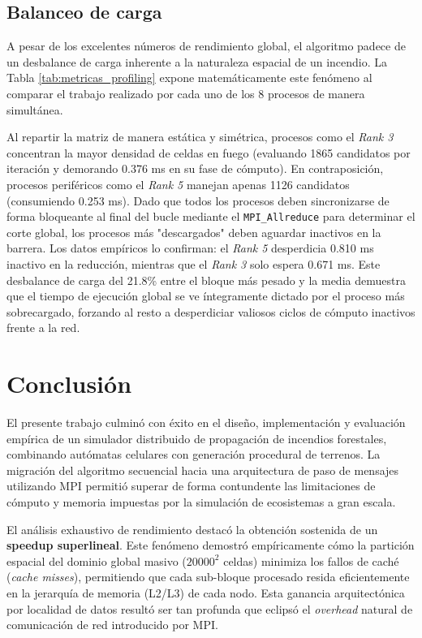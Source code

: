 \documentclass[10pt,a4paper]{article}
\begin{document}
\subsection{Balanceo de carga}
A pesar de los excelentes números de rendimiento global, el algoritmo padece de un desbalance de carga inherente a la naturaleza espacial de un incendio. La Tabla \ref{tab:metricas_profiling} expone matemáticamente este fenómeno al comparar el trabajo realizado por cada uno de los 8 procesos de manera simultánea.

Al repartir la matriz de manera estática y simétrica, procesos como el \textit{Rank 3} concentran la mayor densidad de celdas en fuego (evaluando 1865 candidatos por iteración y demorando 0.376 ms en su fase de cómputo). En contraposición, procesos periféricos como el \textit{Rank 5} manejan apenas 1126 candidatos (consumiendo 0.253 ms). Dado que todos los procesos deben sincronizarse de forma bloqueante al final del bucle mediante el \texttt{MPI\_Allreduce} para determinar el corte global, los procesos más "descargados" deben aguardar inactivos en la barrera. Los datos empíricos lo confirman: el \textit{Rank 5} desperdicia 0.810 ms inactivo en la reducción, mientras que el \textit{Rank 3} solo espera 0.671 ms. Este desbalance de carga del 21.8\% entre el bloque más pesado y la media demuestra que el tiempo de ejecución global se ve íntegramente dictado por el proceso más sobrecargado, forzando al resto a desperdiciar valiosos ciclos de cómputo inactivos frente a la red.

\section{Conclusión}
El presente trabajo culminó con éxito en el diseño, implementación y evaluación empírica de un simulador distribuido de propagación de incendios forestales, combinando autómatas celulares con generación procedural de terrenos. La migración del algoritmo secuencial hacia una arquitectura de paso de mensajes utilizando MPI permitió superar de forma contundente las limitaciones de cómputo y memoria impuestas por la simulación de ecosistemas a gran escala.

El análisis exhaustivo de rendimiento destacó la obtención sostenida de un \textbf{speedup superlineal}. Este fenómeno demostró empíricamente cómo la partición espacial del dominio global masivo ($20000^2$ celdas) minimiza los fallos de caché (\textit{cache misses}), permitiendo que cada sub-bloque procesado resida eficientemente en la jerarquía de memoria (L2/L3) de cada nodo. Esta ganancia arquitectónica por localidad de datos resultó ser tan profunda que eclipsó el \textit{overhead} natural de comunicación de red introducido por MPI.
\end{document}
